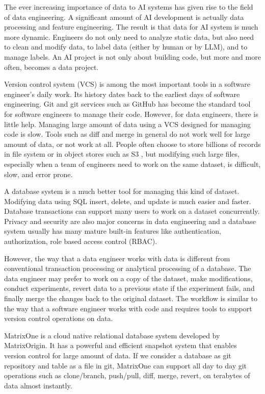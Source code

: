 \documentclass[sigconf,nonacm]{acmart} %
\begin{document}
The ever increasing importance of data to AI systems has given rise to the
field of data engineering.   A significant amount of AI development is actually
data processing and feature engineering.   The result is that data for AI system 
is much 
more dynamic.  Engineers do not only need to analyze static data, but also need to clean
and modify data, to label data (either by human or by LLM), and to manage labels.
An AI project is not only about building code, but more and more often, becomes a data project.

Version control system (VCS) is among the most important tools in a software 
engineer's daily work.  Its history dates back to the earliest days of software
engineering.  Git \cite{Git} and git services such as GitHub has become the standard
tool for software engineers to manage their code.   However, for data engineers,
there is little help.  Managing large amount of data using a VCS designed for managing
code is slow. Tools such as diff and merge in general do not work well for large amount of data,
or not work at all.  People often choose to store billions of records in file system or in 
object stores such as S3 \cite{S3}, but modifying such large files, especially when a team of 
engineers need to work on the same dataset, is difficult, slow, and error prone.

A database system is a much better tool for managing this kind
of dataset.  Modifying data using SQL insert, delete, and update 
is much easier and faster.  Database transactions can support many 
users to work on a dataset concurrently.  Privacy and security are also
major concerns in data engineering and a database system usually has 
many mature built-in features like authentication, authorization, role based 
access control (RBAC). 

However, the way that a data engineer works with data is different from 
conventional transaction processing or analytical processing of a database. 
The data engineer may prefer to work on a copy of the dataset, make modifications,
conduct experiments, revert data to a previous state if the experiment fails,
and finally merge the changes back to the original dataset.
The workflow is similar to the way that a software engineer works with code
and requires tools to support version control operations on data.

MatrixOne is a cloud native relational database system developed by MatrixOrigin.
It has a powerful and efficient snapshot system that enables version control
for large amount of data.  If we consider a database as git repository and 
table as a file in git, MatrixOne can support all day to day git operations such as
clone/branch, push/pull, diff, merge, revert, on terabytes of data almost 
instantly.
\end{document}
